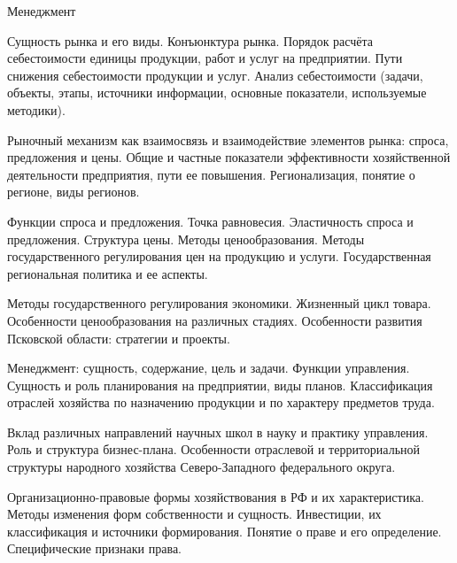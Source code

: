 \documentclass[
	11pt,
	a4paper,
	]
	{article}
\begin{document}
 {Менеджмент}

	

\noindent{} 
	{
		Сущность рынка и его виды. Конъюнктура рынка.
	}{
		Порядок расчёта себестоимости единицы продукции, работ и услуг на предприятии. Пути снижения себестоимости продукции и услуг.
	}{
		Анализ себестоимости (задачи, объекты, этапы, источники информации, основные показатели, используемые методики).
	}

\bigskip

\noindent{} 
	{
		Рыночный механизм как взаимосвязь и взаимодействие элементов рынка: спроса, предложения и цены.
	}{
		Общие и частные показатели эффективности хозяйственной деятельности предприятия, пути ее повышения.
	}{
		Регионализация, понятие о регионе, виды регионов.
	}

\bigskip

\noindent{} 
	{
		Функции спроса и предложения. Точка равновесия. Эластичность спроса и предложения.
	}{
		Структура цены. Методы ценообразования. Методы государственного регулирования цен на продукцию и услуги.
	}{
		Государственная региональная политика и ее аспекты.
	}

\bigskip

\noindent{} 
	{
		Методы государственного регулирования экономики.
	}{
		Жизненный цикл товара. Особенности ценообразования на различных стадиях.
	}{
		Особенности развития Псковской области: стратегии и проекты.
	}

\bigskip

\noindent{} 
	{
		Менеджмент: сущность, содержание, цель и задачи. Функции управления.
	}{
		Сущность и роль планирования на предприятии, виды планов.
	}{
		Классификация отраслей хозяйства по назначению продукции и по характеру предметов труда.
	}

\bigskip

\noindent{} 
	{
		Вклад различных направлений научных школ в науку и практику управления.
	}{
		Роль и структура бизнес-плана.
	}{
		Особенности отраслевой и территориальной структуры народного хозяйства Северо-Западного федерального округа.
	}

\bigskip

\noindent{} 
	{
		Организационно-правовые формы хозяйствования в РФ и их характеристика. Методы изменения форм собственности и сущность.
	}{
		Инвестиции, их классификация и источники формирования.
	}{
		Понятие о праве и его определение. Специфические признаки права.
	}
\end{document}
